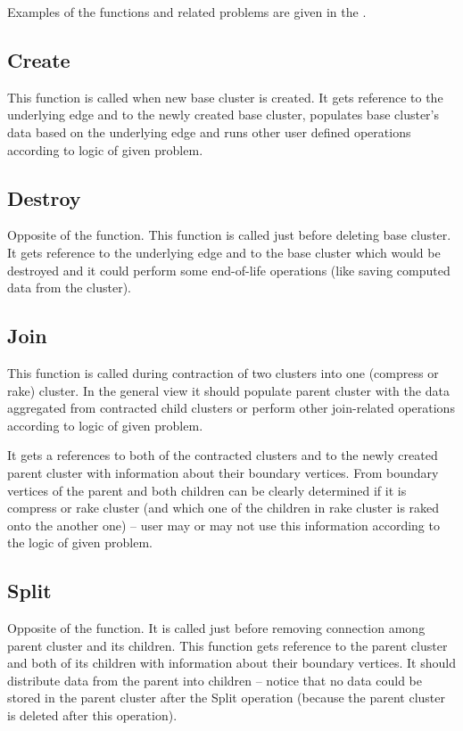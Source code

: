 Examples of the functions and related problems are given in the .

\subsection{\sc Create}

This function is called when new base cluster is created. It gets reference to
the underlying edge and to the newly created base cluster, populates base
cluster's data based on the underlying edge and runs other user defined
operations according to logic of given problem.

\subsection{\sc Destroy}

Opposite of the \Create{} function. This function is called just before deleting
base cluster. It gets reference to the underlying edge and to the base cluster
which would be destroyed and it could perform some end-of-life operations (like
saving computed data from the cluster).

\subsection{\sc Join}

This function is called during contraction of two clusters into one (compress or
rake) cluster. In the general view it should populate parent cluster with the
data aggregated from contracted child clusters or perform other join-related
operations according to logic of given problem.

It gets a references to both of the contracted clusters and to the newly created
parent cluster with information about their boundary vertices. From boundary
vertices of the parent and both children can be clearly determined if it is
compress or rake cluster (and which one of the children in rake cluster is raked
onto the another one) -- user may or may not use this information according to
the logic of given problem.

\subsection{\sc Split}

Opposite of the \Join{} function. It is called just before removing connection
among parent cluster and its children. This function gets reference to the
parent cluster and both of its children with information about their boundary
vertices. It should distribute data from the parent into children -- notice that
no data could be stored in the parent cluster after the Split operation (because
the parent cluster is deleted after this operation).

